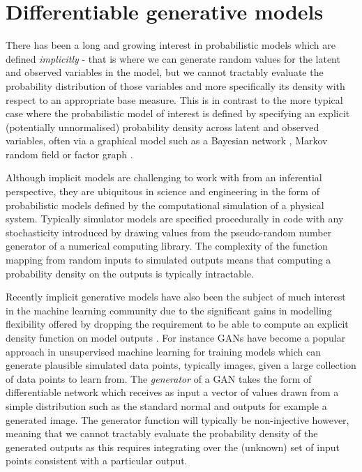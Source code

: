 \chapter{Differentiable generative models}\label{ch:differentiable-generative-models}

There has been a long and growing interest in probabilistic models which are defined \emph{implicitly} \citep{beaumont2002approximate,gourieroux1993indirect,diggle1984monte} - that is where we can generate random values for the latent and observed variables in the model, but we cannot tractably evaluate the probability distribution of those variables and more specifically its density with respect to an appropriate base measure. This is in contrast to the more typical case where the probabilistic model of interest is defined by specifying an explicit (potentially unnormalised) probability density across latent and observed variables, often via a graphical model such as a Bayesian network \citep{pearl1988probabilistic}, Markov random field \citep{kindermann1980markov} or factor graph \citep{frey2002extending}. 


Although implicit models are challenging to work with from an inferential perspective, they are ubiquitous in science and engineering in the form of probabilistic models defined by the computational simulation of a physical system. Typically simulator models are specified procedurally in code with any stochasticity introduced by drawing values from the pseudo-random number generator of a numerical computing library. The complexity of the function mapping from random inputs to simulated outputs means that computing a probability density on the outputs is typically intractable.

Recently implicit generative models have also been the subject of much interest in the machine learning community due to the significant gains in modelling flexibility offered by dropping the requirement to be able to compute an explicit density function on model outputs \citep{mohamed2016learning,tran2017deep}. For instance \acp{GAN} \citep{goodfellow2014generative} have become a popular approach in unsupervised machine learning for training models which can generate plausible simulated data points, typically images, given a large collection of data points to learn from. The \emph{generator} of a \ac{GAN} takes the form of differentiable network which receives as input a vector of values drawn from a simple distribution such as the standard normal and outputs for example a generated image. The generator function will typically be non-injective however, meaning that we cannot tractably evaluate the probability density of the generated outputs as this requires integrating over the (unknown) set of input points consistent with a particular output. %

